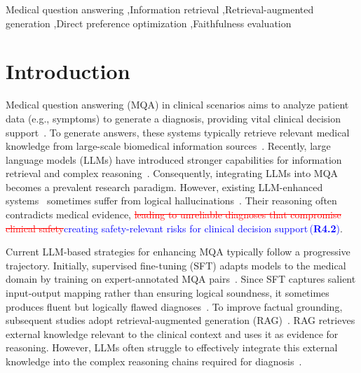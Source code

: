 \documentclass[a4paper,fleqn,doubleblind]{cas-sc}
\DeclareRobustCommand{\deleted}[1]{\textcolor{red}{\sout{#1}}}
\DeclareRobustCommand{\added}[1]{\textcolor{blue}{#1}}
\DeclareRobustCommand{\revtag}[1]{\textcolor{blue}{\scriptsize\,(\textbf{#1})}}
\begin{document}
\begin{keywords}
Medical question answering \sep Information retrieval \sep Retrieval-augmented generation  \sep Direct preference optimization \sep Faithfulness evaluation
\end{keywords}

\maketitle




\section{Introduction}

Medical question answering (MQA) in clinical scenarios aims to analyze patient data (e.g., symptoms) to generate a diagnosis, providing vital clinical decision support~\cite{jin2021disease, pal2022medmcqa}.
To generate answers, these systems typically retrieve relevant medical knowledge from large-scale biomedical information sources~\cite{jin2023medcpt, zakka2024almanac, xiong2024benchmarking, fan2025medeureka, deng2026medicalontologyir, li2026mmre}.
Recently, large language models (LLMs) have introduced stronger capabilities for information retrieval and complex reasoning~\cite{singhal2023large, nori2023capabilities, li2025ragreasoning}.
Consequently, integrating LLMs into MQA becomes a prevalent research paradigm.
However, existing LLM-enhanced systems~\cite{turpin2023unfaithful, lanham2023measuring, ji2023survey} sometimes suffer from logical hallucinations~\cite{huang2025surveyhallucination}. 
Their reasoning often contradicts medical evidence, \deleted{leading to unreliable diagnoses that compromise clinical safety}\added{creating safety-relevant risks for clinical decision support}\revtag{R4.2}.

Current LLM-based strategies for enhancing MQA typically follow a progressive trajectory.
Initially, supervised fine-tuning (SFT) adapts models to the medical domain by training on expert-annotated MQA pairs~\cite{singhal2023large, zhang2023huatuogpt}. 
Since SFT captures salient input-output mapping rather than ensuring logical soundness, it sometimes produces fluent but logically flawed diagnoses~\cite{ji2023survey, li2023hallucination}.
To improve factual grounding, subsequent studies adopt retrieval-augmented generation (RAG)~\cite{zakka2024almanac, xiong2024benchmarking, jamia2025survey, li2026evidencerag}.
RAG retrieves external knowledge relevant to the clinical context and uses it as evidence for reasoning.
However, LLMs often struggle to effectively integrate this external knowledge into the complex reasoning chains required for diagnosis~\cite{liu2024lost, yoran2024making}.
\end{document}
